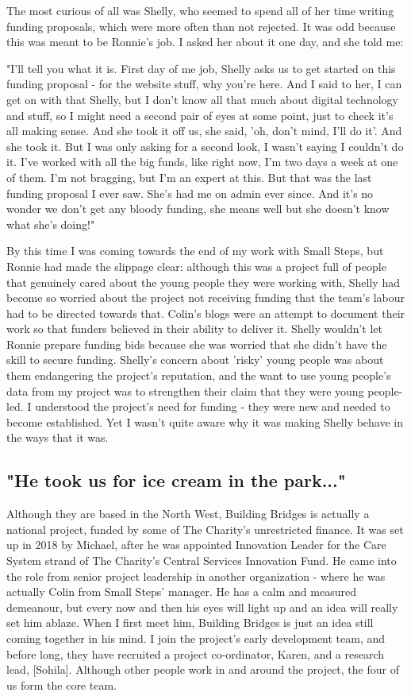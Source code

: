 The most curious of all was Shelly, who seemed to spend all of her time writing funding proposals, which were more often than not rejected. It was odd because this was meant to be Ronnie's job. I asked her about it one day, and she told me:

"I'll tell you what it is. First day of me job, Shelly asks us to get started on this funding proposal - for the website stuff, why you're here. And I said to her, I can get on with that Shelly, but I don't know all that much about digital technology and stuff, so I might need a second pair of eyes at some point, just to check it's all making sense. And she took it off us, she said, 'oh, don't mind, I'll do it'. And she took it. But I was only asking for a second look, I wasn't saying I couldn't do it. I've worked with all the big funds, like right now, I'm two days a week at one of them. I'm not bragging, but I'm an expert at this. But that was the last funding proposal I ever saw. She's had me on admin ever since. And it's no wonder we don't get any bloody funding, she means well but she doesn't know what she's doing!"

By this time I was coming towards the end of my work with Small Steps, but Ronnie had made the slippage clear: although this was a project full of people that genuinely cared about the young people they were working with, Shelly had become so worried about the project not receiving funding that the team's labour had to be directed towards that. Colin's blogs were an attempt to document their work so that funders believed in their ability to deliver it. Shelly wouldn't let Ronnie prepare funding bids because she was worried that she didn't have the skill to secure funding. Shelly's concern about 'risky' young people was about them endangering the project's reputation, and the want to use young people's data from my project was to strengthen their claim that they were young people-led. I understood the project's need for funding - they were new and needed to become established. Yet I wasn't quite aware why it was making Shelly behave in the ways that it was. 

\subsection{"He took us for ice cream in the park..."}
Although they are based in the North West, Building Bridges is actually a national project, funded by some of The Charity's unrestricted finance. It was set up in 2018 by Michael, after he was appointed Innovation Leader for the Care System strand of The Charity's Central Services Innovation Fund. He came into the role from senior project leadership in another organization - where he was actually Colin from Small Steps' manager. He has a calm and measured demeanour, but every now and then his eyes will light up and an idea will really set him ablaze. When I first meet him, Building Bridges is just an idea still coming together in his mind. I join the project's early development team, and before long, they have recruited a project co-ordinator, Karen, and a research lead, [Sohila]. Although other people work in and around the project, the four of us form the core team. 

